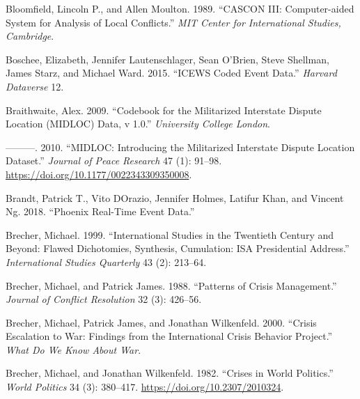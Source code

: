 \documentclass{article}
\newlength{\cslhangindent}
\newlength{\cslentryspacingunit} %
\newenvironment{CSLReferences}[2] %
 {%
  \setlength{\parindent}{0pt}
  \ifodd #1
  \let\oldpar\par
  \def\par{\hangindent=\cslhangindent\oldpar}
  \fi
  \setlength{\parskip}{#2\cslentryspacingunit}
 }%
 {}
\begin{document}
\begin{CSLReferences}{1}{0}
\leavevmode{}%
Bloomfield, Lincoln P., and Allen Moulton. 1989. {``{CASCON III}:
{Computer-aided} System for Analysis of Local Conflicts.''} \emph{MIT
Center for International Studies, Cambridge}.

\leavevmode{}%
Boschee, Elizabeth, Jennifer Lautenschlager, Sean O'Brien, Steve
Shellman, James Starz, and Michael Ward. 2015. {``{ICEWS} Coded Event
Data.''} \emph{Harvard Dataverse} 12.

\leavevmode{}%
Braithwaite, Alex. 2009. {``Codebook for the {Militarized Interstate
Dispute Location} ({MIDLOC}) {Data}, v 1.0.''} \emph{University College
London}.

\leavevmode{}%
---------. 2010. {``{MIDLOC}: {Introducing} the {Militarized Interstate
Dispute Location} Dataset.''} \emph{Journal of Peace Research} 47 (1):
91--98. \url{https://doi.org/10.1177/0022343309350008}.

\leavevmode{}%
Brandt, Patrick T., Vito DOrazio, Jennifer Holmes, Latifur Khan, and
Vincent Ng. 2018. {``Phoenix {Real-Time Event Data}.''}

\leavevmode{}%
Brecher, Michael. 1999. {``International Studies in the Twentieth
Century and Beyond: {Flawed} Dichotomies, Synthesis, Cumulation: {ISA}
Presidential Address.''} \emph{International Studies Quarterly} 43 (2):
213--64.

\leavevmode{}%
Brecher, Michael, and Patrick James. 1988. {``Patterns of Crisis
Management.''} \emph{Journal of Conflict Resolution} 32 (3): 426--56.

\leavevmode{}%
Brecher, Michael, Patrick James, and Jonathan Wilkenfeld. 2000.
{``Crisis Escalation to War: {Findings} from the {International Crisis
Behavior Project}.''} \emph{What Do We Know About War}.

\leavevmode{}%
Brecher, Michael, and Jonathan Wilkenfeld. 1982. {``Crises in {World
Politics}.''} \emph{World Politics} 34 (3): 380--417.
\url{https://doi.org/10.2307/2010324}.


\end{CSLReferences}
\end{document}
